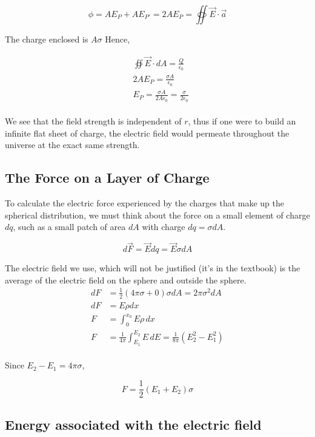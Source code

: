 \documentclass[svgnames]{article}
\begin{document}
\[\phi =  AE_P + AE_{P'} = 2AE_P =\oiint \vec{E} \cdot \vec{a} \] 

The charge enclosed is $A\sigma$ Hence, 

\begin{align*}
&\oiint \vec{E} \cdot dA = \frac{Q}{\epsilon_0} \\ 
&2AE_P = \frac{\sigma A}{\epsilon_0} \\
&E_P = \frac{\sigma A}{2A \epsilon_0} = \frac{\sigma}{2 \epsilon_0}
\end{align*} \\

We see that the field strength is independent of $r$, thus if one were to build
an infinite flat sheet of charge, the electric field would permeate throughout
the universe at the exact same strength. 

\subsection{The Force on a Layer of Charge}

\vspace{20px}

To calculate the electric force experienced by the charges that make up the
spherical distribution, we must think about the force on a small element of
charge $dq$, such as a small patch of area $dA$ with charge $dq = \sigma dA$. 

\[ d\vec{F} = \vec{E} dq = \vec{E} \sigma dA \]

The electric field we use, which will not be justified (it's in the textbook)
is the average of the electric field on the sphere and outside the sphere. \\ 

\begin{align*} 
 dF &= \frac{1}{2} (4\pi \sigma + 0)\sigma dA = 2\pi \sigma^2 dA\\
 dF &=  E \rho dx \\
 F &= \int_0^{x_0} E\rho \, dx \\
 F &= \frac{1}{4\pi} \int_{E_1}^{E_2} E \, dE = \frac{1}{8\pi} (E_2^2 - E_1^2)
 \end{align*} \\
 
 Since $E_2 - E_1 = 4\pi \sigma$, 
 
 \[ F = \frac{1}{2}(E_1 + E_2)\sigma \] 
 
 \subsection{Energy associated with the electric field} 
 
\end{document}
